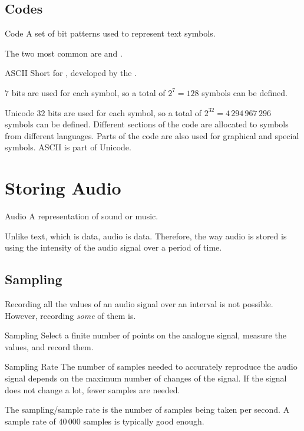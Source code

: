 \documentclass[../notes.tex]{subfiles}
\begin{document}
			\subsection{Codes}
				\begin{definition}{Code}
					A set of bit patterns used to represent text symbols.
				\end{definition}
				The two most common  are  and .
				\begin{definition}{ASCII}
					Short for , developed by the .
					\begin{indentparagraph}
						$7$ bits are used for each symbol, so a total of $2^{7} = 128$ symbols can be defined.
					\end{indentparagraph}
				\end{definition}
				\begin{definition}{Unicode}
					$32$ bits are used for each symbol, so a total of $2^{32} = 4 \, 294 \, 967 \, 296$ symbols can be defined. Different sections of the code are allocated to symbols from different languages. Parts of the code are also used for graphical and special symbols. ASCII is part of Unicode.
				\end{definition}
			\pagebreak
		\section{Storing Audio}
			\begin{definition}{Audio}
				A representation of sound or music.
			\end{definition}
			Unlike text, which is  data, audio is  data. Therefore, the way audio is stored is using the intensity of the audio signal over a period of time.
			\subsection{Sampling}
				Recording all the values of an audio signal over an interval is not possible. However, recording \emph{some} of them is.
				\begin{definition}{Sampling}
					Select a finite number of points on the analogue signal, measure the values, and record them.
				\end{definition}
				\begin{definition}{Sampling Rate}
					The number of samples needed to accurately reproduce the audio signal depends on the maximum number of changes of the signal. If the signal does not change a lot, fewer samples are needed.
					\begin{indentparagraph}
						The sampling/sample rate is the number of samples being taken per second. A sample rate of $40 \, 000$ samples is typically good enough.
					\end{indentparagraph}
				\end{definition}
\end{document}
